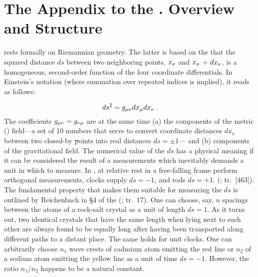 \documentclass[final]{article}
\newcommand{\xadx}{$\xn$ and $\xn$ + $d\xn$\xspace}
\newcommand{\PRZL}{\citetitle{Reichenbach1928}\xspace}
\renewcommand{\rzlp}[2]{(\cite[#1]{Reichenbach1928}; tr.\ #2)\xspace}
\renewcommand{\rzlap}[2]{(\cite[#1]{Reichenbach1928}; tr.\ [#2])\xspace}
\begin{document}
\section{The Appendix to the \PRZL. Overview and Structure}
\label{overview}

\Gr rests formally on Riemannian geometry. The latter is based on the  that the squared distance $ds$ between two neighboring points, \xadx, is a homogeneous, second-order function of the four coordinate differentials. In Einstein's notation (where summation over repeated indices is implied), it reads as follows:

\begin{equation}\label{eq:lineelement}
ds^2=g_{\mu\nu} dx_\mu dx_\nu\,.
\end{equation}
%
The coefficients $g_{\mu\nu}=g_{\nu\mu}$ are at the same time (a) the components of the metric () field---a set of 10 numbers that serve to convert coordinate distances $dx_\nu$ between two closed-by \st points into real distances $ds=\pm 1$--- and (b) components of the gravitational field. The numerical value of the $ds$ has a physical meaning if it can be considered the result of a measurements which inevitably demands a unit in which to measure. In \rt, \rac at relative rest in a free-falling frame perform orthogonal measurements, clocks supply $d s=-1$, and rods $d s=+1$.  \rzlap{331}{463}. The fundamental property that makes them suitable for measuring the $ds$ is outlined by Reichenbach in \S4 of the \PRZL \rzlp{26--27}{17}. One can choose, say, $n$ spacings between the atoms of a rock-salt crystal as a unit of length $ds=1$. As it turns out, two identical crystals that have the same length when lying next to each other are always found to be equally long after having been transported along different paths to a distant place. The same holds for unit clocks. One can arbitrarily choose $n_1$ wave crests of cadmium atom emitting the red line or $n_2$ of a sodium atom emitting the yellow line as a unit of time $ds=-1$. However, the ratio $n_1/n_2$ happens to be a natural constant.
\end{document}
